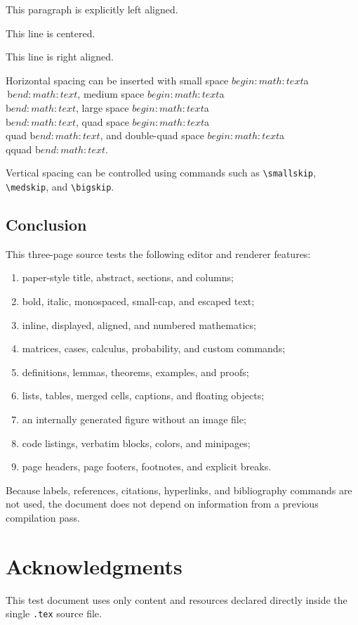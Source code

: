 \documentclass[10pt,a4paper,twocolumn]{article}
\theoremstyle{definition}
\theoremstyle{remark}
\begin{document}
\begin{flushleft}
This paragraph is explicitly left aligned.
\end{flushleft}

\begin{center}
This line is centered.
\end{center}

\begin{flushright}
This line is right aligned.
\end{flushright}

Horizontal spacing can be inserted with
small space $begin:math:text$a\\\,b$end:math:text$,
medium space $begin:math:text$a\\\:b$end:math:text$,
large space $begin:math:text$a\\\;b$end:math:text$,
quad space $begin:math:text$a\\quad b$end:math:text$,
and double-quad space $begin:math:text$a\\qquad b$end:math:text$.

Vertical spacing can be controlled using commands such as
\verb|\smallskip|, \verb|\medskip|, and \verb|\bigskip|.

\subsection{Conclusion}

This three-page source tests the following editor and renderer
features:

\begin{enumerate}[label=\arabic*.]
  \item paper-style title, abstract, sections, and columns;
  \item bold, italic, monospaced, small-cap, and escaped text;
  \item inline, displayed, aligned, and numbered mathematics;
  \item matrices, cases, calculus, probability, and custom commands;
  \item definitions, lemmas, theorems, examples, and proofs;
  \item lists, tables, merged cells, captions, and floating objects;
  \item an internally generated figure without an image file;
  \item code listings, verbatim blocks, colors, and minipages;
  \item page headers, page footers, footnotes, and explicit breaks.
\end{enumerate}

Because labels, references, citations, hyperlinks, and bibliography
commands are not used, the document does not depend on information
from a previous compilation pass.

\section*{Acknowledgments}

This test document uses only content and resources declared directly
inside the single \texttt{.tex} source file.
\end{document}
